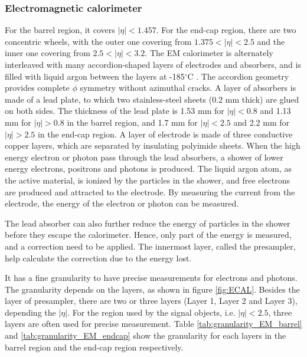 \subsubsection{Electromagnetic calorimeter}
For the barrel region, it covers $|\eta| < 1.457$.
For the end-cap region, there are two concentric wheels, with the outer one covering from $1.375 <|\eta| < 2.5$ and the inner one covering from $2.5 <|\eta| < 3.2$.
The EM calorimeter is alternately interleaved with many accordion-shaped layers of electrodes and absorbers, and is filled with liquid argon between the layers at -185$^{\circ}$C .
The accordion geometry provides complete $\phi$ symmetry without azimuthal cracks.
A layer of absorbers is made of a lead plate, to which two stainless-steel sheets (0.2 mm thick) are glued on both sides.
The thickness of the lead plate is 1.53 mm for $|\eta| < 0.8$ and 1.13 mm for $|\eta| > 0.8$ in the barrel region, and 1.7 mm for $|\eta| < 2.5$ and 2.2 mm for $|\eta| > 2.5$ in the end-cap region.
A layer of electrode is made of three conductive copper layers, which are separated by insulating polyimide sheets.
When the high energy electron or photon pass through the lead absorbers, a shower of lower energy electrons, positrons and photons is produced.
The liquid argon atom, as the active material, is ionized by the particles in the shower, and free electrons are produced and attracted to the electrode.
By measuring the current from the electrode, the energy of the electron or photon can be measured.

The lead absorber can also further reduce the energy of particles in the shower before they escape the calorimeter.
Hence, only part of the energy is measured, and a correction need to be applied.
The innermost layer, called the presampler, help calculate the correction due to the energy lost.

It has a fine granularity to have precise measurements for electrons and photons.
The granularity depends on the layers, as shown in figure \ref{fig:ECAL}.
Besides the layer of presampler, there are two or three layers (Layer 1, Layer 2 and Layer 3), depending the $|\eta|$.
For the region used by the signal objects, i.e. $|\eta|<2.5$, three layers are often used for precise measurement.
Table \ref{tab:granularity_EM_barrel} and \ref{tab:granularity_EM_endcap} show the granularity for each layers in the barrel region and the end-cap region respectively.

